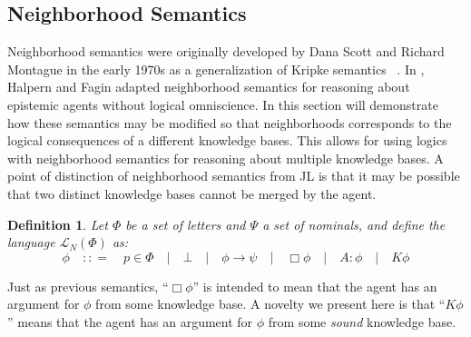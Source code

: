 \documentclass{article}
\newcommand{\tmtextit}[1]{{\itshape{#1}}}
\newtheorem{definition}{Definition}
\begin{document}
\subsection{Neighborhood Semantics}

Neighborhood semantics were originally developed by Dana Scott and Richard
Montague in the early 1970s as a generalization of Kripke semantics \
{\cite{montague_universal_2008,scott_advice_1970}}.  In
{\cite{fagin_belief_1988}}, Halpern and Fagin adapted neighborhood semantics
for reasoning about epistemic agents without logical omniscience.  In this
section will demonstrate how these semantics may be modified so that
neighborhoods corresponds to the logical consequences of a different knowledge
bases.  This allows for using logics with neighborhood semantics for
reasoning about multiple knowledge bases.  A point of distinction of
neighborhood semantics from JL is that it may be possible that two distinct
knowledge bases cannot be merged by the agent.

\begin{definition}
  Let $\Phi$ be a set of letters and $\Psi$ a set of nominals, and define the
  language $\mathcal{L}_N (\Phi)$ as:
  \[ \phi \hspace{1em} : : = \hspace{1em} p \in \Phi \hspace{1em} |
     \hspace{1em} \bot \hspace{1em} | \hspace{1em} \phi \rightarrow \psi
     \hspace{1em} | \hspace{1em} \Box \phi \hspace{1em} | \hspace{1em} A :
     \phi \hspace{1em} | \hspace{1em} K \phi \]
\end{definition}

Just as previous semantics, ``$\Box \phi$'' is intended to mean that the agent
has an argument for $\phi$ from some knowledge base.  A novelty we present
here is that ``$K \phi$'' means that the agent has an argument for $\phi$ from
some \tmtextit{sound} knowledge base.
\end{document}
